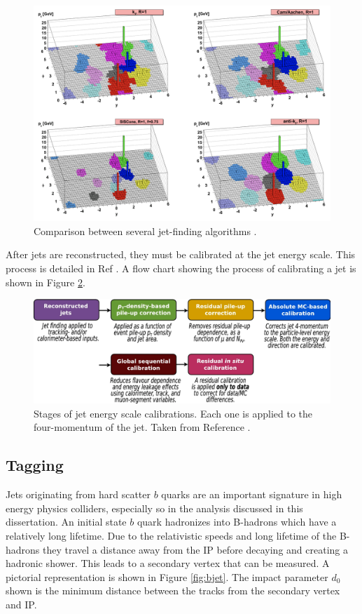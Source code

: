 		\begin{figure}[!ht]
		\centering
		\includegraphics[width=.75\textwidth,keepaspectratio=true]{chapters/chapter5_eventreconnstruction/images/anti-kt-comparison.png}
		\caption{\label{fig:anti-kt-comparison} Comparison between several jet-finding algorithms \cite{anti-kt}.}
		\end{figure}

		After jets are reconstructed, they must be calibrated at the jet energy scale. This process is detailed in Ref \cite{jet-calibration}. A flow chart showing the process of calibrating a jet is shown in Figure \ref{fig:jet-calibration-diagram}.

		\begin{figure}[!ht]
			\centering
			\includegraphics[width=\textwidth,keepaspectratio=true]{chapters/chapter5_eventreconnstruction/images/jet_calibration_diagram.png}
			\caption{\label{fig:jet-calibration-diagram} Stages of jet energy scale calibrations. Each one is applied to the four-momentum of the jet. Taken from Reference \cite{jet-calibration}. }
		\end{figure}

		\subsection{\bjet Tagging}\label{ssec:flavor-tagging}
			Jets originating from hard scatter $b$ quarks are an important signature in high energy physics colliders, especially so in the analysis discussed in this dissertation. An initial state $b$ quark hadronizes into B-hadrons which have a relatively long lifetime. Due to the relativistic speeds and long lifetime of the B-hadrons they travel a distance away from the \gls{IP} before decaying and creating a hadronic shower. This leads to a secondary vertex that can be measured. A pictorial representation is shown in Figure \ref{fig:bjet}. The impact parameter $d_0$ shown is the minimum distance between the tracks from the secondary vertex and \gls{IP}. 

